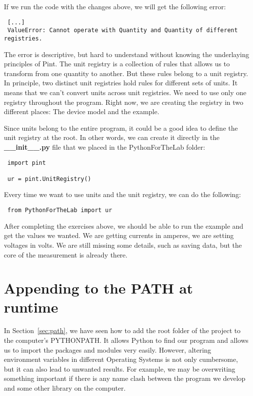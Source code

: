 If we run the code with the changes above, we will get the following error:

\begin{verbatim}
 [...]
 ValueError: Cannot operate with Quantity and Quantity of different registries.
\end{verbatim}

The error is descriptive, but hard to understand without knowing the underlaying principles of Pint. The unit registry is a collection of rules that allows us to transform from one quantity to another. But these rules belong to a unit registry. In principle, two distinct unit registries hold rules for different sets of units. It means that we can't convert units across unit registries. We need to use only one registry throughout the program. Right now, we are creating the registry in two different places: The device model and the example.

Since units belong to the entire program, it could be a good idea to define the unit registry at the root. In other words, we can create it directly in the \textbf{\_\_init\_\_.py} file that we placed in the PythonForTheLab folder:

\begin{verbatim}
 import pint

 ur = pint.UnitRegistry()
\end{verbatim}

Every time we want to use units and the unit registry, we can do the following:

\begin{verbatim}
 from PythonForTheLab import ur
\end{verbatim}



After completing the exercises above, we should be able to run the example and get the values we wanted. We are getting currents in amperes, we are setting voltages in volts. We are still missing some details, such as saving data, but the core of the measurement is already there.

\section{Appending to the PATH at runtime}\label{sec:appending-path}
In Section~\ref{sec:path}, we have seen how to add the root folder of the project to the computer's PYTHONPATH. It allows Python to find our program and allows us to import the packages and modules very easily. However, altering environment variables in different Operating Systems is not only cumbersome, but it can also lead to unwanted results. For example, we may be overwriting something important if there is any name clash between the program we develop and some other library on the computer.

